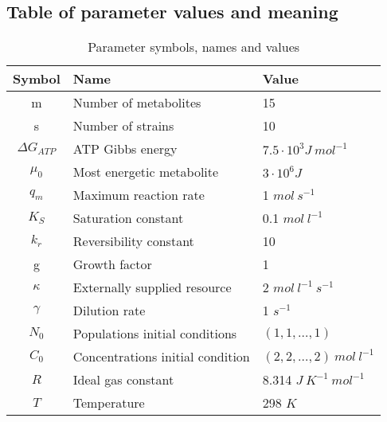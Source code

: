 \documentclass[titlepage,11pt]{article}
\begin{document}
	\subsection{Table of parameter values and meaning}\label{subsec:parameters}
		\begin{table}[h]
			\centering
			\begin{tabular}{ |c|l|l| } 
				\hline
				Symbol & Name & Value \\
				\hline
				m &Number of metabolites &  15 \\
				s &Number of strains &  10 \\
				$ \Delta G_{ATP} $ &ATP Gibbs energy & $ 7.5\cdot 10^{3} J \ mol^{-1}$\\
				$ \mu_0 $ & Most energetic metabolite &  $ 3\cdot 10^{6} J $ \\ 
				$ q_m $ &Maximum reaction rate &  1 $ mol \ s^{-1} $ \\
				$ K_S $ &Saturation constant &   0.1 $ mol \ l^{-1} $ \\
				$ k_r $ &Reversibility constant &  10 \\
				g & Growth factor & 1 \\
				$ \kappa $  & Externally supplied resource &  2 $ mol \ l^{-1} \ s^{-1} $\\
				$ \gamma $ &Dilution rate &   1 $ s^{-1} $\\
				$ N_{0}$ & Populations initial conditions & $ (1, 1, \dots , 1) $ \\
				$ C_{0}$ & Concentrations initial condition & $ (2, 2, \dots , 2) \ mol \ l^{-1}$\\
				$ R $ & Ideal gas constant & 8.314 $ J \ K^{-1} \ mol^{-1} $\\
				$ T $ & Temperature & 298 $ K $\\
				\hline
			\end{tabular}
			\caption{Parameter symbols, names and values}
			\label{tab:parameters}
		\end{table}
\end{document}
